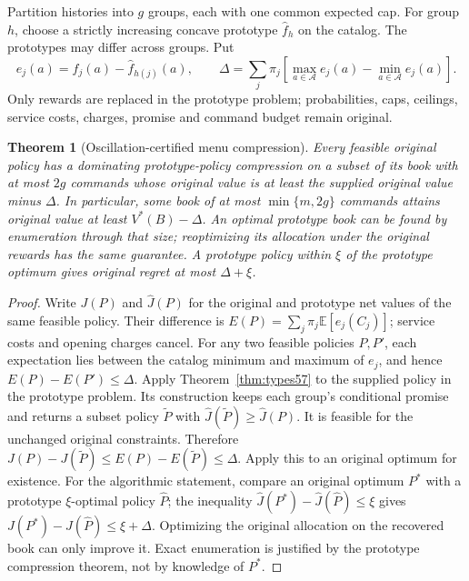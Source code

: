\documentclass[11pt,letterpaper]{article}
\newtheorem{theorem}{Theorem}[section]
\theoremstyle{definition}\newtheorem{remark}[theorem]{Remark}
\begin{document}
Partition histories into $g$ groups, each with one common expected cap. For group $h$, choose a strictly increasing concave prototype $\widehat f_h$ on the catalog. The prototypes may differ across groups. Put
\begin{equation}\label{eq:oscillation58}
 e_j(a)=f_j(a)-\widehat f_{h(j)}(a),\qquad
 \Delta=\sum_j\pi_j\left[\max_{a\in\mathcal A}e_j(a)-\min_{a\in\mathcal A}e_j(a)\right].
\end{equation}
Only rewards are replaced in the prototype problem; probabilities, caps, ceilings, service costs, charges, promise and command budget remain original.
\begin{theorem}[Oscillation-certified menu compression]\label{thm:robusttypes58}
Every feasible original policy has a dominating prototype-policy compression on a subset of its book with at most $2g$ commands whose original value is at least the supplied original value minus $\Delta$. In particular, some book of at most $\min\{m,2g\}$ commands attains original value at least $V^*(B)-\Delta$. An optimal prototype book can be found by enumeration through that size; reoptimizing its allocation under the original rewards has the same guarantee. A prototype policy within $\xi$ of the prototype optimum gives original regret at most $\Delta+\xi$.
\end{theorem}
\begin{proof}
Write $J(P)$ and $\widehat J(P)$ for the original and prototype net values of the same feasible policy. Their difference is
$E(P)=\sum_j\pi_j\mathbb E[e_j(C_j)]$; service costs and opening charges cancel. For any two feasible policies $P,P'$, each expectation lies between the catalog minimum and maximum of $e_j$, and hence
$E(P)-E(P')\leq\Delta$.
Apply Theorem~\ref{thm:types57} to the supplied policy in the prototype problem. Its construction keeps each group's conditional promise and returns a subset policy $\widetilde P$ with $\widehat J(\widetilde P)\geq\widehat J(P)$. It is feasible for the unchanged original constraints. Therefore
$J(P)-J(\widetilde P)\leq E(P)-E(\widetilde P)\leq\Delta$.
Apply this to an original optimum for existence. For the algorithmic statement, compare an original optimum $P^*$ with a prototype $\xi$-optimal policy $\widehat P$; the inequality $\widehat J(P^*)-\widehat J(\widehat P)\leq\xi$ gives $J(P^*)-J(\widehat P)\leq\xi+\Delta$. Optimizing the original allocation on the recovered book can only improve it. Exact enumeration is justified by the prototype compression theorem, not by knowledge of $P^*$.
\end{proof}
\end{document}
